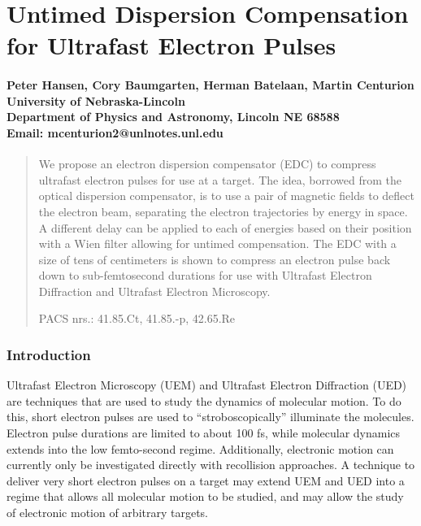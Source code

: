 \documentclass[12pt,letterpaper]{article}
\begin{document}
{
\centering
\part*{Untimed Dispersion Compensation for Ultrafast Electron Pulses}

\subsection*{Peter Hansen, Cory Baumgarten, Herman Batelaan, Martin Centurion\\
University of Nebraska-Lincoln\\
Department of Physics and Astronomy, Lincoln NE 68588\\
Email: mcenturion2@unlnotes.unl.edu}
}

\begin{abstract}
We propose an electron dispersion compensator (EDC) to compress ultrafast electron pulses for use at a target. 
The idea, borrowed from the optical dispersion compensator, is to use a pair of magnetic fields to deflect the electron beam, separating the electron trajectories by energy in space.
A different delay can be applied to each of energies based on their position with a Wien filter allowing for untimed compensation.
The EDC with a size of tens of centimeters is shown to compress an electron pulse back down to sub-femtosecond durations for use with Ultrafast Electron Diffraction and Ultrafast Electron Microscopy. 

PACS nrs.: 41.85.Ct, 41.85.-p, 42.65.Re
\end{abstract}

   \section{Introduction}

Ultrafast Electron Microscopy (UEM) and Ultrafast Electron Diffraction (UED) are techniques that are used to study the dynamics of molecular motion. 
To do this, short electron pulses are used to ``stroboscopically'' illuminate the molecules. 
Electron pulse durations are limited to about 100 fs, while molecular dynamics extends into the low femto-second regime. 
Additionally, electronic motion can currently only be investigated directly with recollision approaches. 
A technique to deliver very short electron pulses on a target may extend UEM and UED into a regime that allows all molecular motion to be studied, and may allow the study of electronic motion of arbitrary targets.
\end{document}
